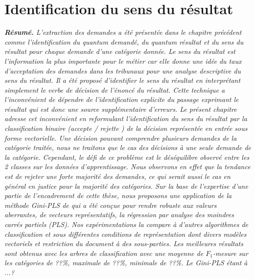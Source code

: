 \chapter{Identification du sens du résultat}
\label{chap:sensresultat}


%
%
%
%
%
%
%

\textit{\small \textbf{Résumé.} L'extraction des demandes a été présentée dans le chapitre précédent comme l'identification du quantum demandé, du quantum résultat et du sens du résultat pour chaque demande d'une catégorie donnée. Le sens du résultat est l'information la plus importante pour le métier car elle donne une idée du taux d'acceptation des demandes dans les tribunaux pour une analyse descriptive du sens du résultat. Il a été proposé d'identifier le sens du résultat en interprétant simplement le verbe de décision de l'énoncé du résultat. Cette technique a l'inconvénient de dépendre de l'identification explicite du passage exprimant le résultat qui est donc une source supplémentaire d'erreurs. Le présent chapitre adresse cet inconvénient en reformulant l'identification du sens du résultat par la classification binaire (\og accepte \fg{} / \og rejette \fg{}) de la décision représentée en entrée sous forme vectorielle. Une décision pouvant comprendre plusieurs demandes de la catégorie traitée, nous ne traitons que le cas des décisions à une seule demande de la catégorie. Cependant, le défi de ce problème est le déséquilibre observé entre les 2 classes sur les données d'apprentissage. Nous observons en effet que la tendance est de rejeter une forte majorité des demandes, ce qui serait aussi le cas en général en justice pour la majorité des catégories. Sur la base de l'expertise d'une partie de l'encadrement de cette thèse, nous proposons une application de la méthode Gini-PLS de \citet{mussard2018ginipls} qui a été conçue pour rendre robuste aux valeurs aberrantes, de vecteurs représentatifs, la régression par analyse des moindres carrés partiels (PLS). Nos expérimentations la compare à d'autres algorithmes de classification et sous différentes conditions de représentation dont divers modèles vectoriels et restriction du document à des sous-parties. Les meilleures résultats sont obtenus avec les arbres de classification avec une moyenne de $F_1$-mesure sur les catégories de ??\%, maximale de ??\%, minimale de ??\%. Le Gini-PLS étant à ...?}


